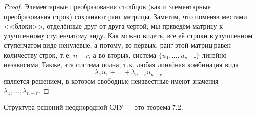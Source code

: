 \begin{proof}
    Элементарные преобразования столбцов (как и элементарные преобразования строк) сохраняют ранг матрицы. Заметим, что поменяв местами <<блоки>>, отделённые друг от друга чертой, мы приведём матрицу к улучшенному ступенчатому виду. Как можно видеть, все её строки в улучшенном ступенчатом виде ненулевые, а потому, во-первых, ранг этой матриц равен количеству строк, т.\,е. $n - r$, а во-вторых, система $\{u_1, \ldots, u_{n - r}\}$ линейно независима. Также, эта система полна, т.\,к. любая линейная комбинация вида
    $$
    \lambda_1u_1 + \ldots + \lambda_{n - r}u_{n - r}
    $$
    является решением, в котором свободные неизвестные имеют значения $\lambda_1, \ldots, \lambda_{n - r}$.
\end{proof}

Структура решений неоднородной СЛУ --- это теорема 7.2.

